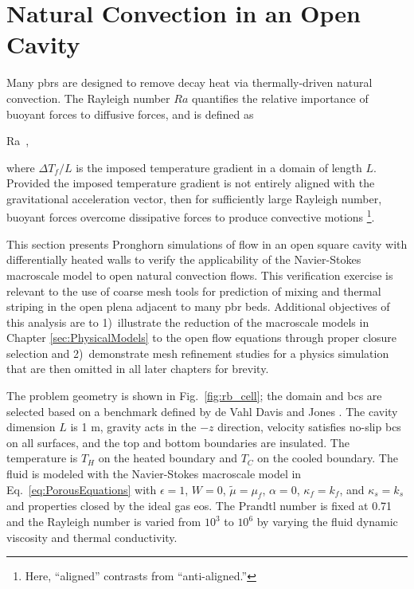 \section{Natural Convection in an Open Cavity}
\label{sec:natural_convection}

Many \glspl{pbr} are designed to remove decay heat via thermally-driven natural convection. The Rayleigh number \(Ra\) quantifies the relative importance of buoyant forces to diffusive forces, and is defined as

\beq
\label{eq:RaDef}
Ra\equiv{}\ ,
\eeq

\noindent where \(\Delta T_f/L\) is the imposed temperature gradient in a domain of length \(L\). Provided the imposed temperature gradient is not entirely aligned with the gravitational acceleration vector, then for sufficiently large Rayleigh number, buoyant forces overcome dissipative forces to produce convective motions \cite{manneville,sandberg}\hspace{0.01cm}\footnote{Here, ``aligned'' contrasts from ``anti-aligned.''}.

This section presents Pronghorn simulations of flow in an open square cavity with differentially heated walls to verify the applicability of the Navier-Stokes macroscale model to open natural convection flows. This verification exercise is relevant to the use of coarse mesh tools for prediction of mixing and thermal striping in the open plena adjacent to many \gls{pbr} beds. Additional objectives of this analysis are to 1)~illustrate the reduction of the macroscale models in Chapter \ref{sec:PhysicalModels} to the open flow equations through proper closure selection and 2)~demonstrate mesh refinement studies for a physics simulation that are then omitted in all later chapters for brevity.

The problem geometry is shown in Fig.\ \ref{fig:rb_cell}; the domain and \glspl{bc} are selected based on a benchmark defined by de Vahl Davis and Jones \cite{davis}. The cavity dimension \(L\) is 1 \si{\meter}, gravity acts in the \(-z\) direction, velocity satisfies no-slip \glspl{bc} on all surfaces, and the top and bottom boundaries are insulated. The temperature is \(T_H\) on the heated boundary and \(T_C\) on the cooled boundary. The fluid is modeled with the Navier-Stokes macroscale model in Eq.\ \eqref{eq:PorousEquations} with \(\epsilon=1\), \(W=0\), \(\tilde{\mu}=\mu_f\), \(\alpha=0\), \(\kappa_f=k_f\), and \(\kappa_s=k_s\) and properties closed by the ideal gas \gls{eos}. The Prandtl number is fixed at 0.71 and the Rayleigh number is varied from \(10^3\) to \(10^6\) by varying the fluid dynamic viscosity and thermal conductivity.

